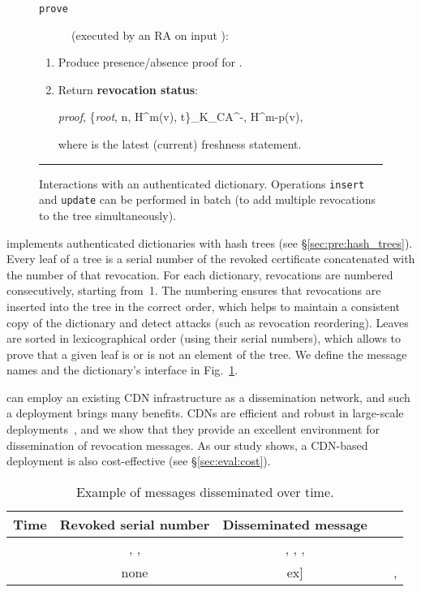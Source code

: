 \begin{figure}
	\begin{description}
		\item[\texttt{prove}] (executed by an RA on input ):
	\end{description}

	\begin{enumerate}
	  \item Produce presence/absence proof for .
	  \item Return \textbf{revocation status}:
	    \begin{centredequ}\label{eq:proof_root}
	      \textit{proof}, \{\textit{root}, n, H^m(v), t\}_{K_{CA}^{-}}, H^{m-p}(v),
	    \end{centredequ}
	    where  is the latest (current) freshness statement.
	\end{enumerate}

	\noindent\rule{\linewidth}{0.5pt}
	\caption{Interactions with an authenticated dictionary. Operations
	\texttt{insert} and \texttt{update} can be performed in batch (to add multiple
	revocations to the tree simultaneously).}\label{fig:auth_dict_api}
\end{figure}


\name implements authenticated dictionaries with hash trees (see
\S\ref{sec:pre:hash_trees}).  Every leaf of a tree is a serial number of the
revoked certificate concatenated with the number of that revocation.  For each
dictionary, revocations are numbered consecutively, starting from~1.  The
numbering ensures that revocations are inserted into the tree in the correct
order, which helps to maintain a consistent copy of the dictionary and detect
attacks (such as revocation reordering). Leaves are sorted in lexicographical
order (using their serial numbers), which allows to prove that a given leaf is
or is not an element of the tree. We define the message names and the
dictionary's interface in Fig.~\ref{fig:auth_dict_api}.

\label{sec:details:diss}
\name can employ an existing CDN infrastructure as a dissemination network, and
such a deployment brings many benefits. CDNs are efficient and robust in
large-scale deployments~\cite{al2011overclocking}, and we show that they provide
an excellent environment for dissemination of revocation messages. As our study
shows, a CDN-based deployment is also cost-effective (see
\S\ref{sec:eval:cost}).


\begin{table}[b!]
\centering
\footnotesize
\begin{tabular}{@{}lcc@{}}
	\toprule
    \textbf{Time} & \textbf{Revoked serial number} & \textbf{Disseminated message} \\
    \midrule
     & , ,  & , , ,  \\
     & none &  \1ex]
     &  & ,  \\
    \bottomrule
\end{tabular}
\caption{Example of messages disseminated over time.}\label{tab:diss}
\end{table}

